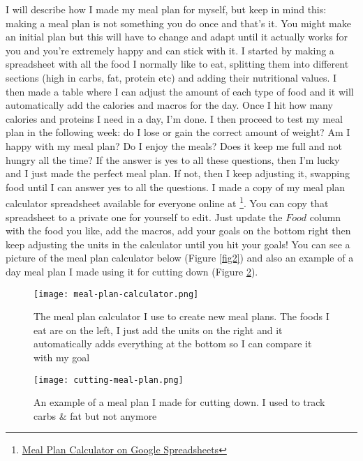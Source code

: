 \documentclass[openany, 12pt]{book}
\begin{document}
        I will describe how I made my meal plan for myself, but keep in mind this: making a meal plan is not something you do once and that's it. You might make an initial plan
        but this will have to change and adapt until it actually works for you and you're extremely happy and can stick with it. I started by making a spreadsheet with all the
        food I normally like to eat, splitting them into different sections (high in carbs, fat, protein etc) and adding their nutritional values. I then made a table where
        I can adjust the amount of each type of food and it will automatically add the calories and macros for the day. Once I hit how many calories and proteins I need in a day, 
        I'm done. I then proceed to test my meal plan in the following week: do I lose or gain the correct amount of weight? Am I happy with my meal plan? Do I enjoy the meals?
        Does it keep me full and not hungry all the time? If the answer is yes to all these questions, then I'm lucky and I just made the perfect meal plan. If not, then I 
        keep adjusting it, swapping food until I can answer yes to all the questions.
        I made a copy of my meal plan calculator spreadsheet available for everyone online at
        \footnote{\href{https://docs.google.com/spreadsheets/d/1DPH4OQuc6yQf3TdUI1D3m1t4UGaiRP1ptWh5f9Y9Y2U/edit}{Meal Plan Calculator on Google Spreadsheets}}.
        You can copy that spreadsheet to a private one for yourself to edit. Just update the $Food$ column with the food you like, add the macros, add your goals on the
        bottom right then keep adjusting the units in the calculator until you hit your goals! You can see a picture of the meal plan calculator below (Figure \ref{fig2}) and 
        also an example of a day meal plan I made using it for cutting down (Figure \ref{fig4}).

	\begin{figure}[h]
		\centering
		\texttt{[image: meal-plan-calculator.png]}
		\caption{The meal plan calculator I use to create new meal plans. The foods I eat are on the left, I just add the units on the right and it automatically adds everything at the bottom so I can compare it with my goal}
		\label{fig3}
	\end{figure}
        
	\begin{figure}[h]
		\centering
		\texttt{[image: cutting-meal-plan.png]}
		\caption{An example of a meal plan I made for cutting down. I used to track carbs \& fat but not anymore}
		\label{fig4}
	\end{figure}
\end{document}
